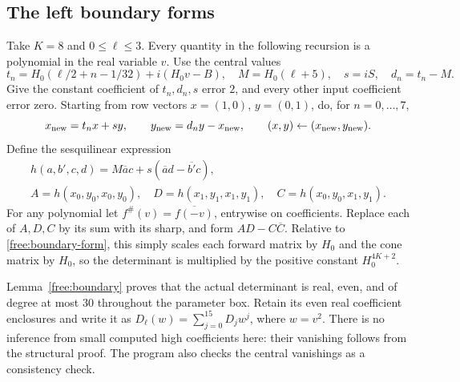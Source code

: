 \subsection{The left boundary forms}\label{cert:boundary}

Take $K=8$ and $0\le\ell\le3$.  Every quantity in the following
recursion is a polynomial in the real variable $v$.  Use the central
values
\[
 t_n=H_0(\ell/2+n-1/32)+i(H_0v-B),\quad
 M=H_0(\ell+5),\quad s=iS,\quad d_n=t_n-M.
\]
Give the constant coefficient of $t_n,d_n,s$ error $2$, and every
other input coefficient error zero.  Starting from row vectors
$x=(1,0)$, $y=(0,1)$, do, for $n=0,\ldots,7$,
\begin{equation}\label{cert:forward-recipe}
 x_{\rm new}=t_nx+sy,\qquad
 y_{\rm new}=d_ny-x_{\rm new},\qquad (x,y)\leftarrow(x_{\rm new},y_{\rm new}).
\end{equation}
Define the sesquilinear expression
\[
 \begin{gathered}
 h(a,b',c,d)=M\overline a c+s(\overline a d-\overline{b'}c),
 \\
 A=h(x_0,y_0,x_0,y_0),\quad
 D=h(x_1,y_1,x_1,y_1),\quad
 C=h(x_0,y_0,x_1,y_1).
 \end{gathered}
\]
For any polynomial let $f^\#(v)=\overline{f(-v)}$, entrywise on
coefficients.  Replace each of $A,D,C$ by its sum with its sharp,
and form $AD-C\overline C$.  Relative to
\eqref{free:boundary-form}, this simply scales each forward matrix by
$H_0$ and the cone matrix by $H_0$, so the determinant is multiplied
by the positive constant $H_0^{4K+2}$.

Lemma~\ref{free:boundary} proves that the actual determinant is real,
even, and of degree at most 30 throughout the parameter box.  Retain
its even real coefficient enclosures and write it as
$D_\ell(w)=\sum_{j=0}^{15}D_jw^j$, where $w=v^2$.
There is no inference from small computed high coefficients here:
their vanishing follows from the structural proof.  The program also
checks the central vanishings as a consistency check.

